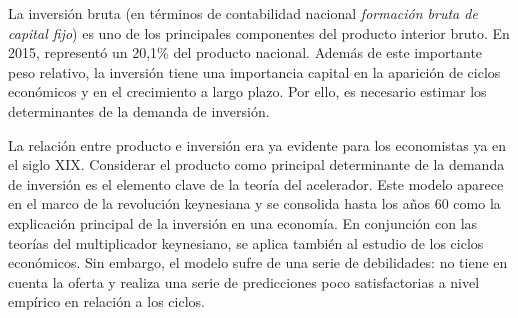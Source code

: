 \documentclass{nuevotema}
\begin{document}
\ideaclave

La inversión bruta (en términos de contabilidad nacional \textit{formación bruta de capital fijo}) es uno de los principales componentes del producto interior bruto. En 2015, representó un 20,1\% del producto nacional. Además de este importante peso relativo, la inversión tiene una importancia capital en la aparición de ciclos económicos y en el crecimiento a largo plazo. Por ello, es necesario estimar los determinantes de la demanda de inversión.

La relación entre producto e inversión era ya evidente para los economistas ya en el siglo XIX. Considerar el producto como principal determinante de la demanda de inversión es el elemento clave de la teoría del acelerador. Este modelo aparece en el marco de la revolución keynesiana y se consolida hasta los años 60 como la explicación principal de la inversión en una economía. En conjunción con las teorías del multiplicador keynesiano, se aplica también al estudio de los ciclos económicos. Sin embargo, el modelo sufre de una serie de debilidades: no tiene en cuenta la oferta y realiza una serie de predicciones poco satisfactorias a nivel empírico en relación a los ciclos.
\end{document}
